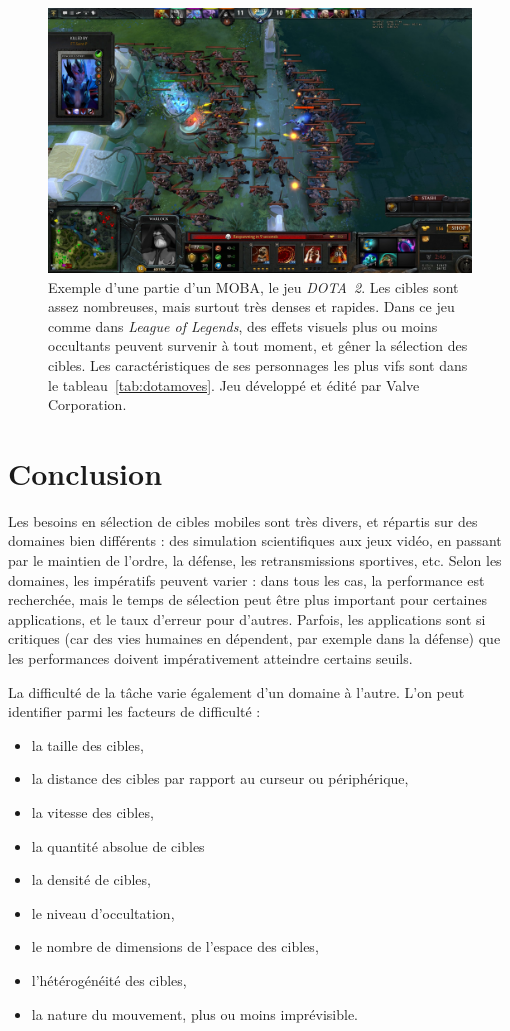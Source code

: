 	\begin{figure}[H]
		\centering
		\includegraphics[width=\textwidth]{figures/ch1/dota2}
		\caption{Exemple d'une partie d'un MOBA, le jeu \emph{DOTA~2}. Les cibles sont assez nombreuses, mais surtout très denses et rapides. Dans ce jeu comme dans \emph{League of Legends}, des effets visuels plus ou moins occultants peuvent survenir à tout moment, et gêner la sélection des cibles. Les caractéristiques de ses personnages les plus vifs sont dans le tableau~\ref{tab:dotamoves}. Jeu développé et édité par Valve Corporation.}
		\label{fig:dota2}
	\end{figure}
	
	
	\section{Conclusion}    
	Les besoins en sélection de cibles mobiles sont très divers, et répartis sur des domaines bien différents : des simulation scientifiques aux jeux vidéo, en passant par le maintien de l'ordre, la défense, les retransmissions sportives, etc. Selon les domaines, les impératifs peuvent varier : dans tous les cas, la performance est recherchée, mais le temps de sélection peut être plus important pour certaines applications, et le taux d'erreur pour d'autres. Parfois, les applications sont si critiques (car des vies humaines en dépendent, par exemple dans la défense) que les performances doivent impérativement atteindre certains seuils.
	
	La difficulté de la tâche varie également d'un domaine à l'autre. L'on peut identifier parmi les facteurs de difficulté :
	\begin{itemize}
		\item la taille des cibles,
		\item la distance des cibles par rapport au \og curseur \fg{} ou périphérique,
		\item la vitesse des cibles,
		\item la quantité absolue de cibles
		\item la densité de cibles,
		\item le niveau d'occultation,
		\item le nombre de dimensions de l'espace des cibles,
		\item l'hétérogénéité des cibles,
		\item la nature du mouvement, plus ou moins imprévisible.
	\end{itemize}
	
